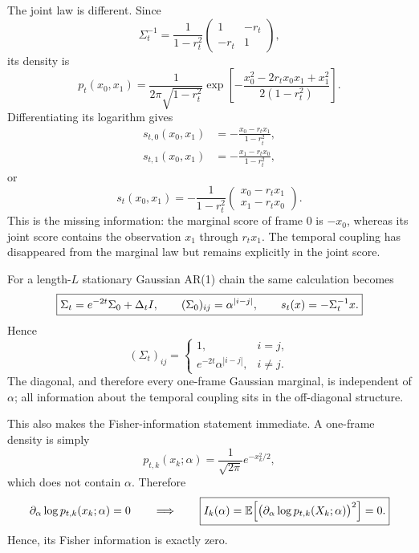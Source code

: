 The joint law is different. Since
\begin{equation}
  \Sigma_t^{-1}
  =
  \frac{1}{1-r_t^2}
  \begin{pmatrix}
    1&-r_t\\
    -r_t&1
  \end{pmatrix},
\end{equation}
its density is
\begin{equation}
  p_t(x_0,x_1)
  =
  \frac{1}{2\pi\sqrt{1-r_t^2}}
  \exp\!\left[
    -\frac{x_0^2-2r_tx_0x_1+x_1^2}
           {2(1-r_t^2)}
  \right].
  \label{eq:dev-L2-density}
\end{equation}
Differentiating its logarithm gives
\begin{align}
  s_{t,0}(x_0,x_1)
  &=
  -\frac{x_0-r_tx_1}{1-r_t^2},\\
  s_{t,1}(x_0,x_1)
  &=
  -\frac{x_1-r_tx_0}{1-r_t^2},
\end{align}
or
\begin{equation}
  \boxed{
  s_t(x_0,x_1)
  =
  -\frac{1}{1-r_t^2}
  \begin{pmatrix}
    x_0-r_tx_1\\
    x_1-r_tx_0
  \end{pmatrix}.}
  \label{eq:dev-L2-score}
\end{equation}
This is the missing information: the marginal score of frame $0$ is
$-x_0$, whereas its joint score contains the observation $x_1$ through
$r_tx_1$. The temporal coupling has disappeared from the marginal law but
remains explicitly in the joint score.

For a length-$L$ stationary Gaussian AR(1) chain the same calculation becomes
\begin{equation}
  \boxed{
  \Sigma_t
  =
  e^{-2t}\Sigma_0+\Delta_t I,
  \qquad
  (\Sigma_0)_{ij}=\alpha^{|i-j|},
  \qquad
  s_t(x)=-\Sigma_t^{-1}x.}
  \label{eq:dev-general-gaussian}
\end{equation}
Hence
\begin{equation}
  (\Sigma_t)_{ij}
  =
  \begin{cases}
    1, & i=j,\\[2mm]
    e^{-2t}\alpha^{|i-j|}, & i\neq j.
  \end{cases}
  \label{eq:dev-general-cov}
\end{equation}
The diagonal, and therefore every one-frame Gaussian marginal, is independent
of $\alpha$; all information about the temporal coupling sits in the
off-diagonal structure.

This also makes the Fisher-information statement immediate. A one-frame
density is simply
\[
  p_{t,k}(x_k;\alpha)
  =
  \frac{1}{\sqrt{2\pi}}e^{-x_k^2/2},
\]
which does not contain $\alpha$. Therefore
\begin{equation}
  \partial_\alpha\log p_{t,k}(x_k;\alpha)=0
  \qquad\Longrightarrow\qquad
  \boxed{
  I_k(\alpha)
  =
  \mathbb{E}\!\left[
    \bigl(\partial_\alpha\log p_{t,k}(X_k;\alpha)\bigr)^2
  \right]
  =0.}
  \label{eq:dev-fisher-zero}
\end{equation}
Hence, its Fisher information is exactly zero.

